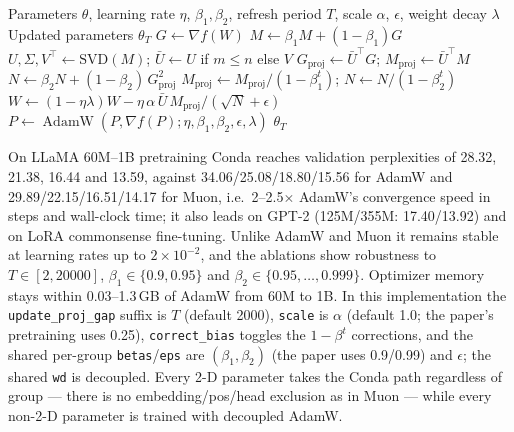 \begin{algorithm}[H]
\caption{Conda (Column-Normalized Adam)}
\label{alg:conda}
\begin{algorithmic}[1]
\Require Parameters $\theta$, learning rate $\eta$, $\beta_1,\beta_2$, refresh period $T$, scale $\alpha$, $\epsilon$, weight decay $\lambda$
\Ensure Updated parameters $\theta_T$
        \State $G \gets \nabla f(W)$ 
        \State $M \gets \beta_1 M + (1-\beta_1) G$ 
            \State $U,\Sigma,V^\top \gets \mathrm{SVD}(M)$;\; $\bar U \gets U$ if $m\le n$ else $V$ 
        \EndIf
        \State $G_{\mathrm{proj}} \gets \bar U^\top G$;\; $M_{\mathrm{proj}} \gets \bar U^\top M$ 
        \State $N \gets \beta_2 N + (1-\beta_2)\, G_{\mathrm{proj}}^2$ 
        \State $M_{\mathrm{proj}} \gets M_{\mathrm{proj}}/(1-\beta_1^t)$;\; $N \gets N/(1-\beta_2^t)$ 
        \State $W \gets (1-\eta\lambda) W - \eta\,\alpha\,\bar U\, M_{\mathrm{proj}}/(\sqrt{N}+\epsilon)$ 
    \Else
        \State $P \gets \operatorname{AdamW}(P, \nabla f(P); \eta, \beta_1, \beta_2, \epsilon, \lambda)$ 
    \EndIf
\EndFor
\Return $\theta_T$
\end{algorithmic}
\end{algorithm}

On LLaMA 60M--1B pretraining Conda reaches validation perplexities of 28.32, 21.38,
16.44 and 13.59, against 34.06/25.08/18.80/15.56 for AdamW and 29.89/22.15/16.51/14.17
for Muon, i.e.\ 2--2.5$\times$ AdamW's convergence speed in steps and wall-clock time;
it also leads on GPT-2 (125M/355M: 17.40/13.92) and on LoRA commonsense fine-tuning.
Unlike AdamW and Muon it remains stable at learning rates up to $2\times10^{-2}$, and the
ablations show robustness to $T \in [2, 20000]$, $\beta_1 \in \{0.9, 0.95\}$ and
$\beta_2 \in \{0.95,\ldots,0.999\}$. Optimizer memory stays within 0.03--1.3\,GB of
AdamW from 60M to 1B. In this implementation the \texttt{update\_proj\_gap} suffix is $T$
(default 2000), \texttt{scale} is $\alpha$ (default 1.0; the paper's pretraining uses
0.25), \texttt{correct\_bias} toggles the $1-\beta^t$ corrections, and the shared
per-group \texttt{betas}/\texttt{eps} are $(\beta_1,\beta_2)$ (the paper uses 0.9/0.99)
and $\epsilon$; the shared \texttt{wd} is decoupled. Every 2-D parameter takes the Conda
path regardless of group --- there is no embedding/pos/head exclusion as in Muon ---
while every non-2-D parameter is trained with decoupled AdamW.

